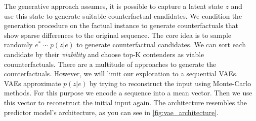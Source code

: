 \documentclass[./../../paper.tex]{subfiles}
\begin{document}




The generative approach assumes, it is possible to capture a latent state $z$ and use this state to generate suitable counterfactual candidates. We condition the generation procedure on the factual instance to generate counterfactuals that show sparse differences to the original sequence. The core idea is to sample randomly $e^* \sim p(z|e)$ to generate counterfactual candidates. We can sort each candidate by their \emph{viability} and choose top-K contenders as viable couunterfactuals. There are a multitude of approaches to generate the counterfactuals. However, we will limit our exploration to a sequential \glspl{VAE}. 
\glspl{VAE} approximate $p(z|e)$ by trying to reconstruct the input using Monte-Carlo methods. For this purpose we encode a sequence into a mean vector. Then we use this vector to reconstruct the initial input again. The architecture resembles the predictor model's architecture, as you can see in \autoref{fig:vae_architecture}.   
\end{document}
